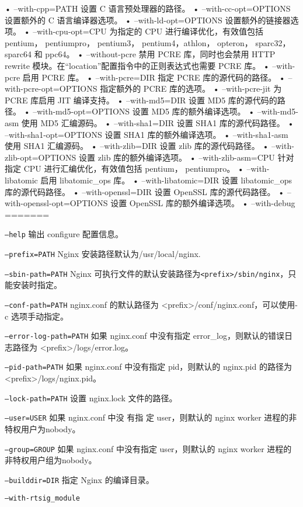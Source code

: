\begin{compactitem}
• --with-cpp=PATH
设置 C 语言预处理器的路径。
• --with-cc-opt=OPTIONS
设置额外的 C 语言编译器选项。
• --with-ld-opt=OPTIONS
设置额外的链接器选项。
• --with-cpu-opt=CPU
为指定的 CPU 进行编译优化，有效值包括 pentium， pentiumpro， pentium3， pentium4，athlon， opteron， sparc32， sparc64 和 ppc64。
• --without-pcre
禁用 PCRE 库，同时也会禁用 HTTP rewrite 模块。在“location”配置指令中的正则表达式也需要 PCRE 库。
• --with-pcre
启用 PCRE 库。
• --with-pcre=DIR
指定 PCRE 库的源代码的路径。
• --with-pcre-opt=OPTIONS
指定额外的 PCRE 库的选项。
• --with-pcre-jit
为 PCRE 库启用 JIT 编译支持。
• --with-md5=DIR
设置 MD5 库的源代码的路径。
• --with-md5-opt=OPTIONS
设置 MD5 库的额外编译选项。
• --with-md5-asm
使用 MD5 汇编源码。
• --with-sha1=DIR
设置 SHA1 库的源代码路径。
• --with-sha1-opt=OPTIONS
设置 SHA1 库的额外编译选项。
• --with-sha1-asm
使用 SHA1 汇编源码。
• --with-zlib=DIR
设置 zlib 库的源代码路径。
• --with-zlib-opt=OPTIONS
设置 zlib 库的额外编译选项。
• --with-zlib-asm=CPU
针对指定 CPU 进行汇编优化，有效值包括 pentium， pentiumpro。
• --with-libatomic
启用 libatomic_ops 库。
• --with-libatomic=DIR
设置 libatomic_ops 库的源代码路径。
• --with-openssl=DIR
设置 OpenSSL 库的源代码路径。
• --with-openssl-opt=OPTIONS
设置 OpenSSL 库的额外编译选项。
• --with-debug
=======
\item \texttt{--help}
输出 configure 配置信息。
\item \texttt{--prefix=PATH}
Nginx 安装路径默认为/usr/local/nginx.
\item \texttt{--sbin-path=PATH}
Nginx 可执行文件的默认安装路径为\texttt{<prefix>/sbin/nginx}，只能安装时指定。
\item \texttt{--conf-path=PATH}
nginx.conf 的默认路径为 <prefix>/conf/nginx.conf，可以使用-c 选项手动指定。
\item \texttt{--error-log-path=PATH}
如果 nginx.conf 中没有指定 error\_log，则默认的错误日志路径为 <prefix>/logs/error.log。
\item \texttt{--pid-path=PATH}
如果 nginx.conf 中没有指定 pid，则默认的 nginx.pid 的路径为 <prefix>/logs/nginx.pid。
\item \texttt{--lock-path=PATH}
设置 nginx.lock 文件的路径。
\item \texttt{--user=USER}
如果 nginx.conf 中没 有指 定 user，则默认的 nginx worker 进程的非特权用户为nobody。
\item \texttt{--group=GROUP}
如果 nginx.conf 中没有指定 user，则默认的 nginx worker 进程的非特权用户组为nobody。
\item \texttt{--builddir=DIR}
指定 Nginx 的编译目录。
\item \texttt{--with-rtsig\_module}

\end{compactitem}
